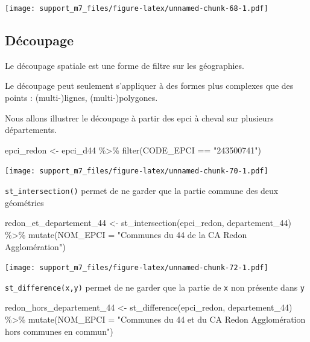 \documentclass[
]{book}
\newenvironment{Shaded}{\begin{snugshade}}{\end{snugshade}}
\newcommand{\AttributeTok}[1]{\textcolor[rgb]{0.77,0.63,0.00}{#1}}
\newcommand{\FunctionTok}[1]{\textcolor[rgb]{0.00,0.00,0.00}{#1}}
\newcommand{\NormalTok}[1]{#1}
\newcommand{\OtherTok}[1]{\textcolor[rgb]{0.56,0.35,0.01}{#1}}
\newcommand{\SpecialCharTok}[1]{\textcolor[rgb]{0.00,0.00,0.00}{#1}}
\newcommand{\StringTok}[1]{\textcolor[rgb]{0.31,0.60,0.02}{#1}}
\begin{document}
\texttt{[image: support\_m7\_files/figure-latex/unnamed-chunk-68-1.pdf]}

\hypertarget{duxe9coupage}{%
\subsection{Découpage}\label{duxe9coupage}}

Le découpage spatiale est une forme de filtre sur les géographies.

Le découpage peut seulement s'appliquer à des formes plus complexes que des points : (multi-)lignes, (multi-)polygones.

Nous allons illustrer le découpage à partir des epci à cheval sur plusieurs départements.

\begin{Shaded}
\begin{Highlighting}[]
\NormalTok{epci\_redon }\OtherTok{\textless{}{-}}\NormalTok{ epci\_d44 }\SpecialCharTok{\%\textgreater{}\%}
  \FunctionTok{filter}\NormalTok{(CODE\_EPCI }\SpecialCharTok{==} \StringTok{"243500741"}\NormalTok{)}
\end{Highlighting}
\end{Shaded}

\texttt{[image: support\_m7\_files/figure-latex/unnamed-chunk-70-1.pdf]}

\texttt{st\_intersection()} permet de ne garder que la partie commune des deux géométries

\begin{Shaded}
\begin{Highlighting}[]
\NormalTok{redon\_et\_departement\_44 }\OtherTok{\textless{}{-}} \FunctionTok{st\_intersection}\NormalTok{(epci\_redon, departement\_44) }\SpecialCharTok{\%\textgreater{}\%}
  \FunctionTok{mutate}\NormalTok{(}\AttributeTok{NOM\_EPCI =} \StringTok{"Communes du 44 de la CA Redon Agglomération"}\NormalTok{)}
\end{Highlighting}
\end{Shaded}

\texttt{[image: support\_m7\_files/figure-latex/unnamed-chunk-72-1.pdf]}

\texttt{st\_difference(x,y)} permet de ne garder que la partie de \texttt{x} non présente dans \texttt{y}

\begin{Shaded}
\begin{Highlighting}[]
\NormalTok{redon\_hors\_departement\_44 }\OtherTok{\textless{}{-}} \FunctionTok{st\_difference}\NormalTok{(epci\_redon, departement\_44) }\SpecialCharTok{\%\textgreater{}\%}
  \FunctionTok{mutate}\NormalTok{(}\AttributeTok{NOM\_EPCI =} \StringTok{"Communes du 44 et du CA Redon Agglomération hors communes en commun"}\NormalTok{)}
\end{Highlighting}
\end{Shaded}
\end{document}
